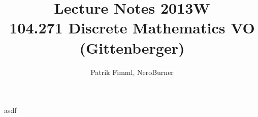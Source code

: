 \documentclass[10pt,a4paper,titlepage,oneside,final]{book}
\author{Patrik Fimml, NeroBurner}
\title{Lecture Notes 2013W\\ 104.271 Discrete Mathematics VO\\ (Gittenberger)}
\theoremstyle{custom}
\begin{document}
\def\dt#1{\textbf{#1}}

\def\remark{\noindent \textbf{Remark.}}



\maketitle
\tableofcontents
asdf 

%

\printindex
\end{document}
